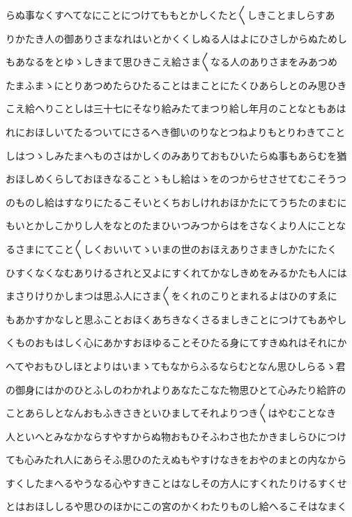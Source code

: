 \documentclass[a4paper,11pt,landscape]{ltjtarticle}
\begin{document}
らぬ事なくすへてなにことにつけてももとかしくたと〱しきことましらすあ
\par\medskip
りかたき人の御ありさまなれはいとかくくしぬる人はよにひさしからぬためし
\par\medskip
もあなるをとゆゝしきまて思ひきこえ給さま〱なる人のありさまをみあつめ
\par\medskip
たまふまゝにとりあつめたらひたることはまことにたくひあらしとのみ思ひき
\par\medskip
こえ給へりことしは三十七にそなり給みたてまつり給し年月のことなともあは
\par\medskip
れにおほしいてたるついてにさるへき御いのりなとつねよりもとりわきてこと
\par\medskip
しはつゝしみたまへものさはかしくのみありておもひいたらぬ事もあらむを猶
\par\medskip
おほしめくらしておほきなることゝもし給はゝをのつからせさせてむこそうつ
\par\medskip
のものし給はすなりにたるこそいとくちおしけれおほかたにてうちたのまむに
\par\medskip
もいとかしこかりし人をなとのたまひいつみつからはをさなくより人にことな
\par\medskip
るさまにてこと〱しくおいいてゝいまの世のおほえありさまきしかたにたく
\par\medskip
ひすくなくなむありけるされと又よにすくれてかなしきめをみるかたも人には
\par\medskip
まさりけりかしまつは思ふ人にさま〱をくれのこりとまれるよはひのすゑに
\par\medskip
もあかすかなしと思ふことおほくあちきなくさるましきことにつけてもあやし
\par\medskip
くものおもはしく心にあかすおほゆることそひたる身にてすきぬれはそれにか
\par\medskip
へてやおもひしほとよりはいまゝてもなからふるならむとなん思ひしらるゝ君
\par\medskip
の御身にはかのひとふしのわかれよりあなたこなた物思ひとて心みたり給許の
\par\medskip
ことあらしとなんおもふきさきといひましてそれよりつき〱はやむことなき
\par\medskip
人といへとみなかならすやすからぬ物おもひそふわさ也たかきましらひにつけ
\par\medskip
ても心みたれ人にあらそふ思ひのたえぬもやすけなきをおやのまとの内なから
\par\medskip
すくしたまへるやうなる心やすきことはなしその方人にすくれたりけるすくせ
\par\medskip
とはおほししるや思ひのほかにこの宮のかくわたりものし給へるこそはなまく
\end{document}
